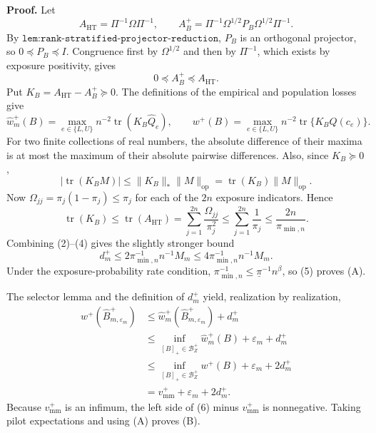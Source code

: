 \textbf{Proof.}
Let
\[
A_{\mathrm{HT}}=\Pi^{-1}\Omega\Pi^{-1},
\qquad
A_B^+=\Pi^{-1}\Omega^{1/2}P_B\Omega^{1/2}\Pi^{-1}.
\]
By \(\texttt{lem:rank-stratified-projector-reduction}\), \(P_B\) is an orthogonal projector, so \(0\preceq P_B\preceq I\).  Congruence first by \(\Omega^{1/2}\) and then by \(\Pi^{-1}\), which exists by exposure positivity, gives
\[
0\preceq A_B^+\preceq A_{\mathrm{HT}}.
\tag{1}
\]
Put \(K_B=A_{\mathrm{HT}}-A_B^+\succeq0\).  The definitions of the empirical and population losses give
\[
\widehat w_m^+(B)=\max_{e\in\{L,U\}}n^{-2}
\operatorname{tr}(K_B\widehat Q_e),
\qquad
w^+(B)=\max_{e\in\{L,U\}}n^{-2}
\operatorname{tr}\{K_BQ(c_e)\}.
\tag{2}
\]
For two finite collections of real numbers, the absolute difference of their maxima is at most the maximum of their absolute pairwise differences.  Also, since \(K_B\succeq0\),
\[
|\operatorname{tr}(K_BM)|
\le\lVert K_B\rVert_*\lVert M\rVert_{\mathrm{op}}
=\operatorname{tr}(K_B)\lVert M\rVert_{\mathrm{op}}.
\tag{3}
\]
Now \(\Omega_{jj}=\pi_j(1-\pi_j)\le\pi_j\) for each of the \(2n\) exposure indicators.  Hence
\[
\operatorname{tr}(K_B)
\le\operatorname{tr}(A_{\mathrm{HT}})
=\sum_{j=1}^{2n}\frac{\Omega_{jj}}{\pi_j^2}
\le\sum_{j=1}^{2n}\frac1{\pi_j}
\le\frac{2n}{\pi_{\min,n}}.
\tag{4}
\]
Combining (2)--(4) gives the slightly stronger bound
\[
d_m^+\le2\pi_{\min,n}^{-1}n^{-1}M_m
\le4\pi_{\min,n}^{-1}n^{-1}M_m.
\tag{5}
\]
Under the exposure-probability rate condition, \(\pi_{\min,n}^{-1}\le\underline\pi^{-1}n^\beta\), so (5) proves (A).

The selector lemma and the definition of \(d_m^+\) yield, realization by realization,
\[
\begin{aligned}
w^+(\widehat B_{m,\varepsilon_m}^+)
&\le \widehat w_m^+(\widehat B_{m,\varepsilon_m}^+)+d_m^+\\
&\le \inf_{[B]_+\in\mathcal B_Z^+}\widehat w_m^+(B)
+\varepsilon_m+d_m^+\\
&\le \inf_{[B]_+\in\mathcal B_Z^+}w^+(B)
+\varepsilon_m+2d_m^+\\
&=v_{\mathrm{mm}}^++\varepsilon_m+2d_m^+.
\end{aligned}
\tag{6}
\]
Because \(v_{\mathrm{mm}}^+\) is an infimum, the left side of (6) minus \(v_{\mathrm{mm}}^+\) is nonnegative.  Taking pilot expectations and using (A) proves (B).

